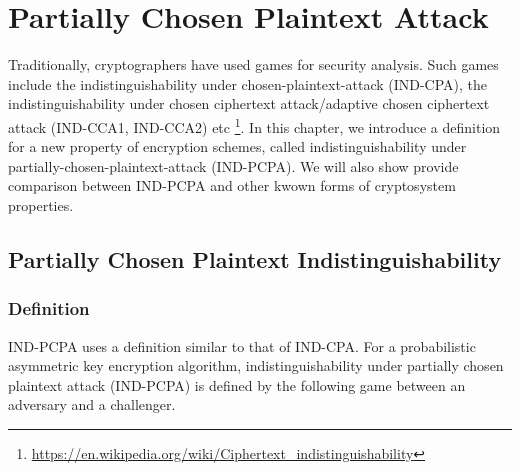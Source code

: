 \chapter{Partially Chosen Plaintext Attack}\label{ch:pcpa}

Traditionally, cryptographers have used games for security analysis. Such games
include the indistinguishability under chosen-plaintext-attack (IND-CPA), the
indistinguishability under chosen ciphertext attack/adaptive chosen ciphertext
attack (IND-CCA1, IND-CCA2) etc
\footnote{\url{https://en.wikipedia.org/wiki/Ciphertext_indistinguishability}}.
In this chapter, we introduce a definition for a new property of encryption
schemes, called indistinguishability under partially-chosen-plaintext-attack
(IND-PCPA). We will also show provide comparison between IND-PCPA and other
kwown forms of cryptosystem properties.

\section{Partially Chosen Plaintext Indistinguishability}\label{sec:indpcpa}

\subsection{Definition} IND-PCPA uses a definition similar to that of IND-CPA.
For a probabilistic asymmetric key encryption algorithm, indistinguishability
under partially chosen plaintext attack (IND-PCPA) is defined by the following
game between an adversary and a challenger.

